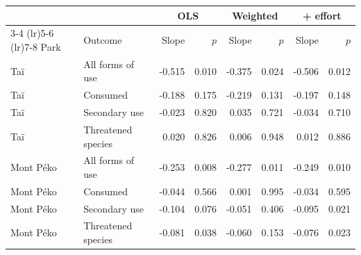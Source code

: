 \begin{tabular}{llrrrrrr}
\toprule
 & & \multicolumn{2}{c}{OLS} & \multicolumn{2}{c}{Weighted} & \multicolumn{2}{c}{+ effort} \\
\cmidrule(lr){3-4} \cmidrule(lr){5-6} \cmidrule(lr){7-8}
Park & Outcome & Slope & $p$ & Slope & $p$ & Slope & $p$ \\
\midrule
Taï & All forms of use &  -0.515 & 0.010 &  -0.375 & 0.024 &  -0.506 & 0.012 \\
Taï & Consumed &  -0.188 & 0.175 &  -0.219 & 0.131 &  -0.197 & 0.148 \\
Taï & Secondary use &  -0.023 & 0.820 &   0.035 & 0.721 &  -0.034 & 0.710 \\
Taï & Threatened species &   0.020 & 0.826 &   0.006 & 0.948 &   0.012 & 0.886 \\
Mont Péko & All forms of use &  -0.253 & 0.008 &  -0.277 & 0.011 &  -0.249 & 0.010 \\
Mont Péko & Consumed &  -0.044 & 0.566 &   0.001 & 0.995 &  -0.034 & 0.595 \\
Mont Péko & Secondary use &  -0.104 & 0.076 &  -0.051 & 0.406 &  -0.095 & 0.021 \\
Mont Péko & Threatened species &  -0.081 & 0.038 &  -0.060 & 0.153 &  -0.076 & 0.023 \\
\bottomrule
\end{tabular}
